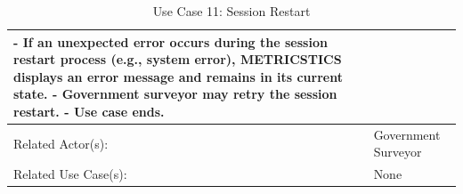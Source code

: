 \begin{table}[h]
\begin{tabular}{ | p{4cm} | p{10cm} | }
{   - If an unexpected error occurs during the session restart process (e.g., system error), METRICSTICS displays an error message and remains in its current state. \newline
   - Government surveyor may retry the session restart. \newline
   - Use case ends.}\\
 \hline
 Related Actor(s): & Government Surveyor\\
 \hline
 Related Use Case(s): & None\\
 \hline
 \end{tabular}
\renewcommand{\thetable}{\arabic{table}}
\caption{Use Case 11: Session Restart}
\label{tab:table1}
\end{table}


